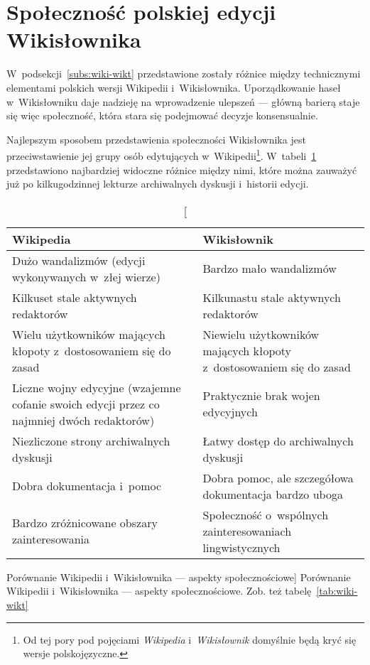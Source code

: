 \section{Społeczność polskiej edycji Wikisłownika}
\label{sec:plsoc}
W~podsekcji~\ref{subs:wiki-wikt} przedstawione zostały różnice między technicznymi elementami polskich wersji Wikipedii i~Wikisłownika. Uporządkowanie haseł w~Wikisłowniku daje nadzieję na wprowadzenie ulepszeń --- główną barierą staje się więc społeczność, która stara się podejmować decyzje konsensualnie.

Najlepszym sposobem przedstawienia społeczności Wikisłownika jest przeciwstawienie jej grupy osób edytujących w~Wikipedii\footnote{Od tej pory pod pojęciami \emph{Wikipedia} i~\emph{Wikisłownik} domyślnie będą kryć się wersje polskojęzyczne.}. W~tabeli~\ref{tab:wiki-wikt2} przedstawiono najbardziej widoczne różnice między nimi, które można zauważyć już po kilkugodzinnej lekturze archiwalnych dyskusji i~historii edycji.

\begin{table}[h]
\begin{center}
	\begin{tabularx}{\textwidth}{ XX }
		\toprule \textbf{Wikipedia} & \textbf{Wikisłownik} \\
		\midrule Dużo wandalizmów (edycji wykonywanych w~złej wierze)
			& Bardzo mało wandalizmów \\
		\midrule Kilkuset stale aktywnych redaktorów
			& Kilkunastu stale aktywnych redaktorów \\
		\midrule Wielu użytkowników mających kłopoty z~dostosowaniem się do zasad
			& Niewielu użytkowników mających kłopoty z~dostosowaniem się do zasad \\
		\midrule Liczne wojny edycyjne (wzajemne cofanie swoich edycji przez co najmniej dwóch redaktorów)
			& Praktycznie brak wojen edycyjnych \\
		\midrule Niezliczone strony archiwalnych dyskusji
			& Łatwy dostęp do archiwalnych dyskusji \\
		\midrule Dobra dokumentacja i~pomoc
			& Dobra pomoc, ale szczegółowa dokumentacja bardzo uboga \\
		\midrule Bardzo zróżnicowane obszary zainteresowania
			& Społeczność o~wspólnych zainteresowaniach lingwistycznych \\
		\bottomrule
	\end{tabularx}
\caption
	[Porównanie Wikipedii i~Wikisłownika --- aspekty społecznościowe]
	{Porównanie Wikipedii i~Wikisłownika --- aspekty społecznościowe. Zob. też tabelę~\ref{tab:wiki-wikt}}
\label{tab:wiki-wikt2}
\end{center}
\end{table}

